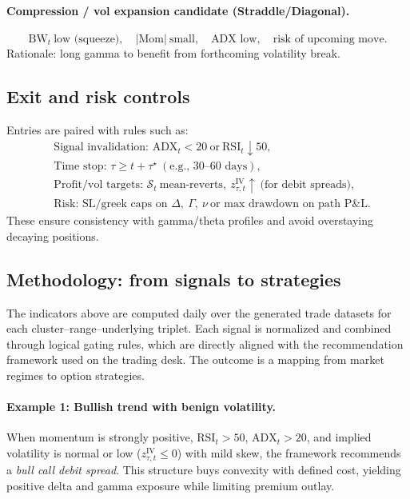 \documentclass[12pt,a4paper]{report}
\begin{document}
\paragraph{Compression / vol expansion candidate (Straddle/Diagonal).}
\[
\text{BW}_t\ \text{low (squeeze)},\quad |\text{Mom}|\ \text{small},\quad \text{ADX low},\quad \text{risk of upcoming move}.
\]
Rationale: long gamma to benefit from forthcoming volatility break.

\subsection{Exit and risk controls}
Entries are paired with rules such as:
\begin{align*}
&\text{Signal invalidation: } \text{ADX}_t<20 \ \text{or}\ \text{RSI}_t\downarrow 50,\\
&\text{Time stop: } \tau\ge t+\tau^\star\ (\text{e.g., 30--60 days}),\\
&\text{Profit/vol targets: } \mathcal{S}_t\ \text{mean‑reverts},\ z^{\text{IV}}_{\tau,t}\uparrow\ \text{(for debit spreads)},\\
&\text{Risk: } \text{SL/greek caps on } \Delta,\ \Gamma,\ \nu\ \text{or max drawdown on path P\&L}.
\end{align*}
These ensure consistency with gamma/theta profiles and avoid overstaying decaying positions.

\subsection{Methodology: from signals to strategies}

The indicators above are computed daily over the generated trade datasets for each cluster–range–underlying triplet. Each signal is normalized and combined through logical gating rules, which are directly aligned with the recommendation framework used on the trading desk. The outcome is a mapping from market regimes to option strategies.

\paragraph{Example 1: Bullish trend with benign volatility.}
When momentum is strongly positive, $\text{RSI}_t>50$, $\text{ADX}_t>20$, and implied volatility is normal or low ($z^{\text{IV}}_{\tau,t}\le 0$) with mild skew, the framework recommends a \emph{bull call debit spread}. This structure buys convexity with defined cost, yielding positive delta and gamma exposure while limiting premium outlay.
\end{document}
